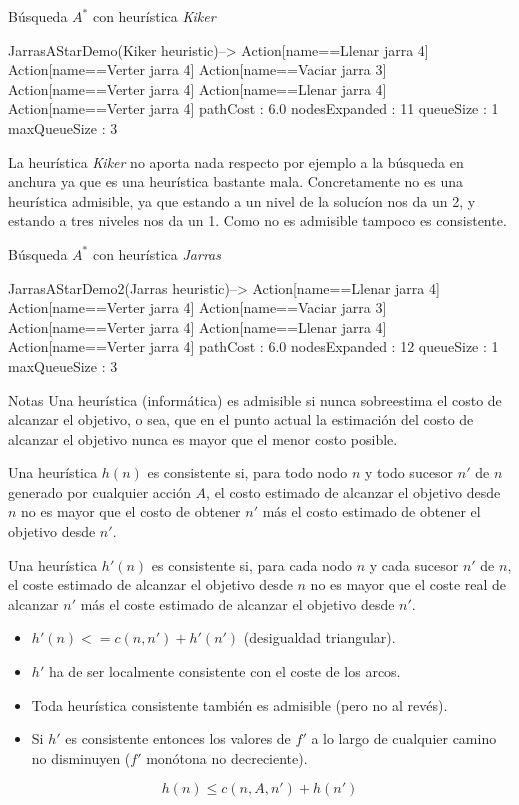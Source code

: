 \documentclass[11pt, a4paper, spanish, openright, twoside]{book}
\begin{document}
\begin{section}{Búsqueda $A^*$ con heurística \textit{Kiker}}



JarrasAStarDemo(Kiker heuristic)-->
Action[name==Llenar jarra 4]
Action[name==Verter jarra 4]
Action[name==Vaciar jarra 3]
Action[name==Verter jarra 4]
Action[name==Llenar jarra 4]
Action[name==Verter jarra 4]
pathCost : 6.0
nodesExpanded : 11
queueSize : 1
maxQueueSize : 3

La heurística  \textit{Kiker} no aporta nada respecto por ejemplo a la búsqueda en anchura ya que es una heurística bastante mala. Concretamente no es 
una heurística admisible, ya que estando a un nivel de la solucíon nos da un 2, y estando a tres niveles nos da un 1. Como no es admisible tampoco es consistente.


\end{section}
\begin{section}{Búsqueda $A^*$ con heurística \textit{Jarras}}

JarrasAStarDemo2(Jarras heuristic)-->
Action[name==Llenar jarra 4]
Action[name==Verter jarra 4]
Action[name==Vaciar jarra 3]
Action[name==Verter jarra 4]
Action[name==Llenar jarra 4]
Action[name==Verter jarra 4]
pathCost : 6.0
nodesExpanded : 12
queueSize : 1
maxQueueSize : 3

\end{section}
\begin{section}{Notas}
	Una heurística (informática) es admisible si nunca sobreestima el costo de alcanzar el objetivo, o sea, 
que en el punto actual la estimación del costo de alcanzar el objetivo nunca es mayor que el menor costo posible.

	Una heurística $h(n)$ es consistente si, para todo nodo $n$ y todo sucesor $n'$ de $n$ generado por cualquier acción $A$, el costo estimado de alcanzar el objetivo desde $n$ no es mayor que el costo de obtener $n'$ más el costo estimado de obtener el objetivo desde $n'$.

	Una heurística $h'(n)$ es consistente si, para cada nodo $n$ y cada sucesor $n'$ de $n$, el coste 
	estimado de alcanzar el objetivo desde $n$ no es mayor que el coste real de 
	alcanzar $n'$ más el coste estimado de alcanzar el objetivo desde $n'$.
		\begin{itemize}
		\item  $h'(n) <= c(n, n') + h'(n')$ (desigualdad triangular).
		\item  $h'$  ha de ser localmente consistente con el coste de los arcos.
		\item Toda heurística consistente también es admisible (pero no al revés).
		\item Si $h'$ es consistente entonces los valores de $f'$ a lo largo de cualquier 
		camino no disminuyen ($f'$ monótona no decreciente).
		\end{itemize}

$$h(n) \le c(n, A, n') + h(n')$$
\end{section}
\end{document}
